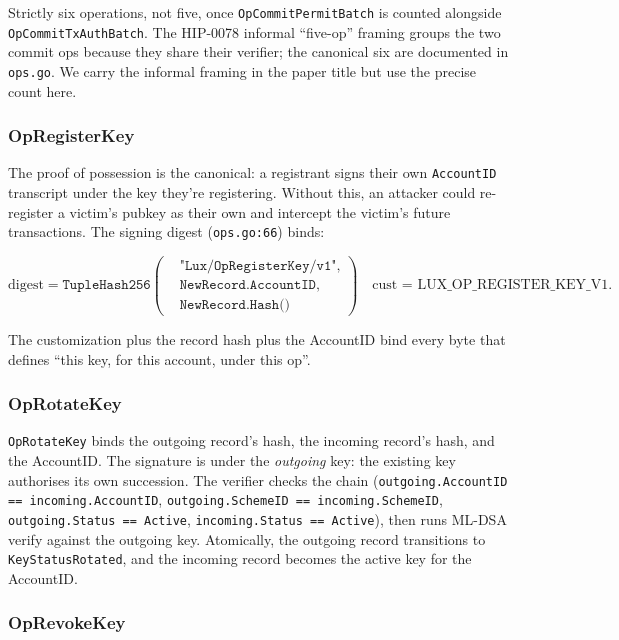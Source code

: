Strictly six operations, not five, once \texttt{OpCommitPermitBatch} is
counted alongside \texttt{OpCommitTxAuthBatch}. The HIP-0078 informal
``five-op'' framing groups the two commit ops because they share their
verifier; the canonical six are documented in \texttt{ops.go}. We carry the
informal framing in the paper title but use the precise count here.

\subsubsection{OpRegisterKey}

The proof of possession is the canonical: a registrant signs their own
\texttt{AccountID} transcript under the key they're registering. Without
this, an attacker could re-register a victim's pubkey as their own and
intercept the victim's future transactions. The signing digest
(\texttt{ops.go:66}) binds:

\[
\text{digest} = \texttt{TupleHash256}\left(\begin{aligned}
& \texttt{"Lux/OpRegisterKey/v1"}, \\
& \texttt{NewRecord.AccountID}, \\
& \texttt{NewRecord.Hash()}
\end{aligned}\right) \quad \text{cust = LUX\_OP\_REGISTER\_KEY\_V1}.
\]

The customization plus the record hash plus the AccountID bind every byte
that defines ``this key, for this account, under this op''.

\subsubsection{OpRotateKey}

\texttt{OpRotateKey} binds the outgoing record's hash, the incoming record's
hash, and the AccountID. The signature is under the \emph{outgoing} key:
the existing key authorises its own succession. The verifier checks the
chain (\texttt{outgoing.AccountID == incoming.AccountID},
\texttt{outgoing.SchemeID == incoming.SchemeID}, \texttt{outgoing.Status ==
Active}, \texttt{incoming.Status == Active}), then runs ML-DSA verify against
the outgoing key. Atomically, the outgoing record transitions to
\texttt{KeyStatusRotated}, and the incoming record becomes the active key
for the AccountID.

\subsubsection{OpRevokeKey}

